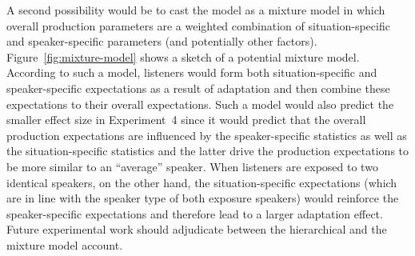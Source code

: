 A second possibility would be to cast the model as a mixture model in which overall production parameters are a 
weighted combination of situation-specific and speaker-specific parameters (and potentially other factors). 
Figure~\ref{fig:mixture-model} shows a sketch of a potential mixture model.
According to such a model, listeners would form both situation-specific and speaker-specific
expectations as a result of adaptation and then combine these expectations to their overall expectations. 
Such a model would also predict the smaller effect size in Experiment~4 since it would predict
that the overall production expectations are influenced by the speaker-specific statistics as 
well as the situation-specific statistics and the latter drive the production expectations to be more similar to
an ``average'' speaker. When listeners are exposed to two identical speakers, on the other hand, the 
situation-specific expectations (which are in line with the speaker type of both exposure speakers) 
would reinforce the speaker-specific expectations and therefore lead to a larger adaptation effect. Future experimental work should adjudicate between the hierarchical and the mixture model account.

